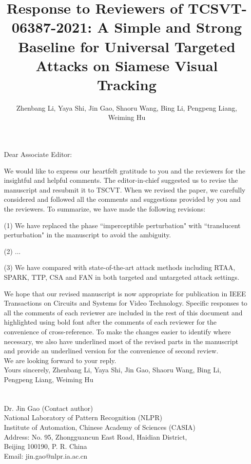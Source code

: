 \documentclass[12pt]{article}
\begin{document}
\linespread{1}
\title{Response to Reviewers of TCSVT-06387-2021: A Simple and Strong Baseline for Universal Targeted Attacks on Siamese Visual Tracking}
\author{\normalsize{Zhenbang Li, Yaya Shi, Jin Gao, Shaoru Wang, Bing Li, Pengpeng Liang, Weiming Hu}}
\date{}
\maketitle

\noindent Dear Associate Editor:

We would like to express our heartfelt gratitude to you and the reviewers for the insightful and helpful comments. 
The editor-in-chief suggested us to revise the manuscript and resubmit it to TSCVT.
When we revised the paper, we carefully considered and followed all the comments and suggestions provided by you and the reviewers. To summarize, we have made the following revisions:

(1) We have replaced the phase ``imperceptible perturbation" with ``translucent perturbation" in the manuscript to avoid the ambiguity.

(2) ...

(3) We have compared with state-of-the-art attack methods including RTAA, SPARK, TTP, CSA and FAN in both targeted and untargeted attack settings.

We hope that our revised manuscript is now appropriate for publication in IEEE Transactions on Circuits and Systems for Video Technology. Specific responses to all the comments of each reviewer are included in the rest of this document and highlighted using bold font after the comments of each reviewer for the convenience of cross-reference. To make the changes easier to identify where necessary, we also have underlined most of the revised parts in the manuscript and provide an underlined version for the convenience of second review.\\[10pt]
\indent We are looking forward to your reply.\\[10pt]
\noindent Yours sincerely,
\noindent Zhenbang Li, Yaya Shi, Jin Gao, Shaoru Wang, Bing Li, Pengpeng Liang, Weiming Hu
\\
\\
\\
\noindent Dr. Jin Gao (Contact author)\\
\noindent National Laboratory of Pattern Recognition (NLPR)\\
\noindent Institute of Automation, Chinese Academy of Sciences (CASIA)\\
\noindent Address: No. 95, Zhongguancun East Road, Haidian District,\\
\noindent Beijing 100190, P. R. China\\
\noindent Email: jin.gao@nlpr.ia.ac.cn
\end{document}
